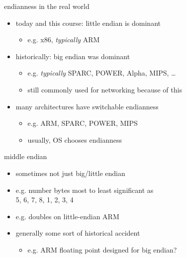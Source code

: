 \begin{frame}{endianness in the real world}
\begin{itemize}
\item today and this course: little endian is dominant
    \begin{itemize}
    \item e.g. x86, \textit{typically} ARM
    \end{itemize}
\item historically: big endian was dominant
    \begin{itemize}
    \item e.g. \textit{typically} SPARC, POWER, Alpha, MIPS, \ldots
    \item still commonly used for networking because of this
    \end{itemize}
\item many architectures have switchable endianness
    \begin{itemize}
    \item e.g. ARM, SPARC, POWER, MIPS
    \item usually, OS chooses endianness
    \end{itemize}
\end{itemize}
\end{frame}

\begin{frame}{middle endian}
\begin{itemize}
\item sometimes not just big/little endian
\item e.g. number bytes most to least significant as \\
    5, 6, 7, 8, 1, 2, 3, 4
\item e.g. doubles on little-endian ARM
\item generally some sort of historical accident
    \begin{itemize}
    \item e.g. ARM floating point designed for big endian?
    \end{itemize}
\end{itemize}
\end{frame}
